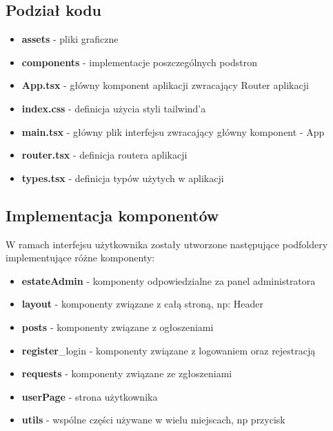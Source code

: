 \subsection{Podział kodu}
\begin{itemize}
    \item \textbf{assets} - pliki graficzne
    \item \textbf{components} - implementacje poszczególnych podstron
    \item \textbf{App.tsx} - główny komponent aplikacji zwracający Router aplikacji
    \item \textbf{index.css} - definicja użycia styli tailwind'a
    \item \textbf{main.tsx} - główny plik interfejsu zwracający główny komponent - App
    \item \textbf{router.tsx} - definicja routera aplikacji
    \item \textbf{types.tsx} - definicja typów użytych w aplikacji
\end{itemize}
\subsection{Implementacja komponentów}
W ramach interfejsu użytkownika zostały utworzone następujące podfoldery implementujące różne komponenty:
\begin{itemize}
    \item \textbf{estateAdmin} - komponenty odpowiedzialne za panel administratora
    \item \textbf{layout} - komponenty związane z całą stroną, np: Header
    \item \textbf{posts} - komponenty związane z ogłoszeniami
    \item \textbf{register}\_login - komponenty związane z logowaniem oraz rejestracją
    \item \textbf{requests} - komponenty związane ze zgłoszeniami
    \item \textbf{userPage} - strona użytkownika
    \item \textbf{utils} - wspólne części używane w wielu miejscach, np przycisk
\end{itemize}

